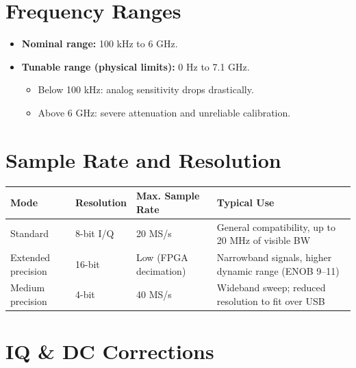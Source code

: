 \documentclass[11pt]{article}
\begin{document}
\section{Frequency Ranges}

\begin{itemize}
    \item \textbf{Nominal range:} 100 kHz to 6 GHz.
    \item \textbf{Tunable range (physical limits):} 0 Hz to 7.1 GHz.
    \begin{itemize}
        \item Below 100 kHz: analog sensitivity drops drastically.
        \item Above 6 GHz: severe attenuation and unreliable calibration.
    \end{itemize}
\end{itemize}

\section{Sample Rate and Resolution}

\begin{table}[h]
    \centering
    \small
    \begin{tabular}{@{}p{}p{}p{}p{}@{}}
        \toprule
        \textbf{Mode} & \textbf{Resolution} & \textbf{Max. Sample Rate} & \textbf{Typical Use} \\
        \midrule
        Standard       & 8-bit I/Q & 20 MS/s & General compatibility, up to 20 MHz of visible BW \\
        Extended precision & 16-bit & Low (FPGA decimation) & Narrowband signals, higher dynamic range (ENOB 9--11) \\
        Medium precision & 4-bit & 40 MS/s & Wideband sweep; reduced resolution to fit over USB \\
        \bottomrule
    \end{tabular}
\end{table}

\section{IQ \& DC Corrections}
\end{document}
